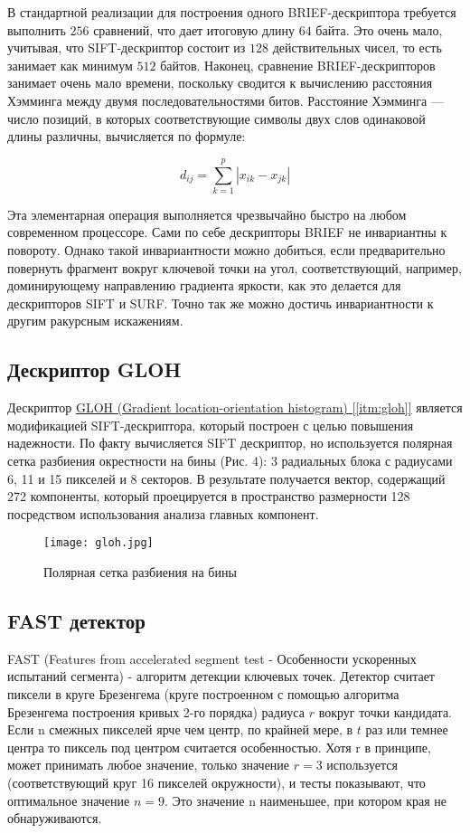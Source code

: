 В стандартной реализации для построения одного BRIEF-дескриптора требуется выполнить $256$ сравнений, что дает итоговую длину $64$ байта. Это очень мало, учитывая, что SIFT-дескриптор состоит из $128$ действительных чисел, то есть занимает как минимум $512$ байтов. Наконец, сравнение BRIEF-дескрипторов занимает очень мало времени, поскольку сводится к вычислению расстояния Хэмминга между двумя последовательностями битов. Расстояние Хэмминга — число позиций, в которых соответствующие символы двух слов одинаковой длины различны, вычисляется по формуле:

\begin{equation}
    d_{ij} = \sum_{k=1}^{p}|x_{ik} - x_{jk}|
\end{equation}

Эта элементарная операция выполняется чрезвычайно быстро на любом современном процессоре. Сами по себе дескрипторы BRIEF не инвариантны к повороту. Однако такой инвариантности можно добиться, если предварительно повернуть фрагмент вокруг ключевой точки на угол, соответствующий, например, доминирующему направлению градиента яркости, как это делается для дескрипторов SIFT и SURF. Точно так же можно достичь инвариантности к другим ракурсным искажениям.

\subsection{Дескриптор GLOH}

Дескриптор \hyperref[itm:gloh]{ GLOH (Gradient location-orientation histogram) [\ref{itm:gloh}]} является модификацией SIFT-дескриптора, который построен с целью повышения надежности. По факту вычисляется SIFT дескриптор, но используется полярная сетка разбиения окрестности на бины (Рис. 4): 3 радиальных блока с радиусами 6, 11 и 15 пикселей и 8 секторов. В результате получается вектор, содержащий 272 компоненты, который проецируется в пространство размерности 128 посредством использования анализа главных компонент.

\begin{figure}[h]
    \centering
    \texttt{[image: gloh.jpg]}
    \caption{Полярная сетка разбиения на бины}
    \label{fig:gloh}
\end{figure}

\subsection{FAST детектор}

FAST (Features from accelerated segment test - Особенности ускоренных испытаний сегмента) - алгоритм детекции ключевых точек. Детектор считает пиксели в круге Брезенгема (круге построенном с помощью алгоритма Брезенгема построения кривых 2-го порядка) радиуса $r$ вокруг точки кандидата. Если n смежных пикселей ярче чем центр, по крайней мере, в $t$ раз или темнее центра то пиксель под центром считается особенностью. Хотя r в принципе, может принимать любое значение, только значение $r=3$ используется (соответствующий круг 16 пикселей окружности), и тесты показывают, что оптимальное значение $n=9$. Это значение n наименьшее, при котором края не обнаруживаются.

